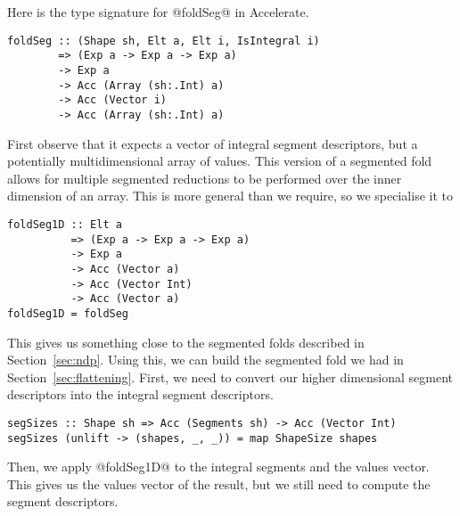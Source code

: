 Here is the type signature for @foldSeg@ in Accelerate.
%
\begin{lstlisting}
foldSeg :: (Shape sh, Elt a, Elt i, IsIntegral i)
        => (Exp a -> Exp a -> Exp a)
        -> Exp a
        -> Acc (Array (sh:.Int) a)
        -> Acc (Vector i)
        -> Acc (Array (sh:.Int) a)
\end{lstlisting}
%
First observe that it expects a vector of integral segment descriptors, but a potentially multidimensional array of values. This version of a segmented fold allows for multiple segmented reductions to be performed over the inner dimension of an array. This is more general than we require, so we specialise it to
%
\begin{lstlisting}
foldSeg1D :: Elt a
          => (Exp a -> Exp a -> Exp a)
          -> Exp a
          -> Acc (Vector a)
          -> Acc (Vector Int)
          -> Acc (Vector a)
foldSeg1D = foldSeg
\end{lstlisting}
%
This gives us something close to the segmented folds described in Section~\ref{sec:ndp}. Using this, we can build the segmented fold we had in Section~\ref{sec:flattening}. First, we need to convert our higher dimensional segment descriptors into the integral segment descriptors.
%
\begin{lstlisting}
segSizes :: Shape sh => Acc (Segments sh) -> Acc (Vector Int)
segSizes (unlift -> (shapes, _, _)) = map ShapeSize shapes
\end{lstlisting}
%
Then, we apply @foldSeg1D@ to the integral segments and the values vector. This gives us the values vector of the result, but we still need to compute the segment descriptors.

